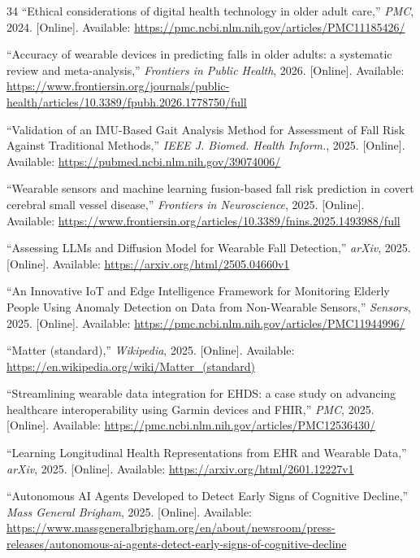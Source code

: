 \documentclass[conference]{IEEEtran}
\begin{document}
\begin{thebibliography}{34}
``Ethical considerations of digital health technology in older adult care,'' \textit{PMC}, 2024. [Online]. Available: \url{https://pmc.ncbi.nlm.nih.gov/articles/PMC11185426/}

``Accuracy of wearable devices in predicting falls in older adults: a systematic review and meta-analysis,'' \textit{Frontiers in Public Health}, 2026. [Online]. Available: \url{https://www.frontiersin.org/journals/public-health/articles/10.3389/fpubh.2026.1778750/full}

``Validation of an IMU-Based Gait Analysis Method for Assessment of Fall Risk Against Traditional Methods,'' \textit{IEEE J. Biomed. Health Inform.}, 2025. [Online]. Available: \url{https://pubmed.ncbi.nlm.nih.gov/39074006/}

``Wearable sensors and machine learning fusion-based fall risk prediction in covert cerebral small vessel disease,'' \textit{Frontiers in Neuroscience}, 2025. [Online]. Available: \url{https://www.frontiersin.org/articles/10.3389/fnins.2025.1493988/full}

``Assessing LLMs and Diffusion Model for Wearable Fall Detection,'' \textit{arXiv}, 2025. [Online]. Available: \url{https://arxiv.org/html/2505.04660v1}

``An Innovative IoT and Edge Intelligence Framework for Monitoring Elderly People Using Anomaly Detection on Data from Non-Wearable Sensors,'' \textit{Sensors}, 2025. [Online]. Available: \url{https://pmc.ncbi.nlm.nih.gov/articles/PMC11944996/}

``Matter (standard),'' \textit{Wikipedia}, 2025. [Online]. Available: \url{https://en.wikipedia.org/wiki/Matter_(standard)}

``Streamlining wearable data integration for EHDS: a case study on advancing healthcare interoperability using Garmin devices and FHIR,'' \textit{PMC}, 2025. [Online]. Available: \url{https://pmc.ncbi.nlm.nih.gov/articles/PMC12536430/}

``Learning Longitudinal Health Representations from EHR and Wearable Data,'' \textit{arXiv}, 2025. [Online]. Available: \url{https://arxiv.org/html/2601.12227v1}

``Autonomous AI Agents Developed to Detect Early Signs of Cognitive Decline,'' \textit{Mass General Brigham}, 2025. [Online]. Available: \url{https://www.massgeneralbrigham.org/en/about/newsroom/press-releases/autonomous-ai-agents-detect-early-signs-of-cognitive-decline}


\end{thebibliography}
\end{document}

